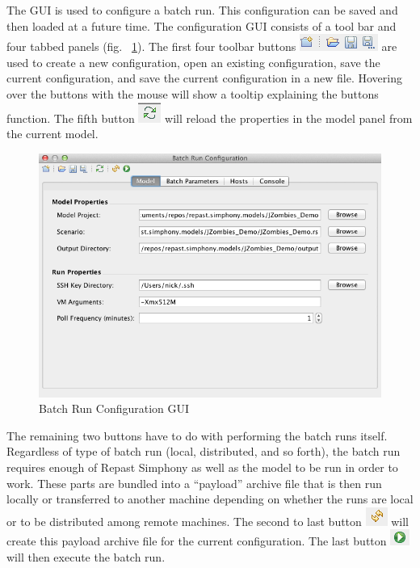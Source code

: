 \documentclass[11pt]{amsart}
\begin{document}
The GUI is used to configure a batch run. This configuration can be saved and then loaded at a future time. The configuration GUI consists of a tool bar and four tabbed panels (fig. ~\ref{fig:config_gui}). The first four toolbar buttons \includegraphics[height=.2in]{images/gui_file_buttons.png} are used to create a new configuration, open an existing configuration, save the current configuration, and save the current configuration in a new file. Hovering over the buttons with the mouse will show a tooltip explaining the buttons function.  The fifth button \includegraphics[height=.2in]{images/reload_button.png} will reload the properties in the model panel from the current model. 

\begin{figure}[h]
\begin{center}
\vspace{.2in}
\centerline {
\includegraphics[width=6in]{images/config_gui.png}
}
\caption{Batch Run Configuration GUI}
\label{fig:config_gui}
\end{center}
\end{figure}


The remaining two buttons have to do with performing the batch runs itself. Regardless of type of batch run (local, distributed, and so forth), the batch run requires enough of Repast Simphony as well as the model to be run in order to work. These parts are bundled into a ``payload'' archive file that is then run locally or transferred to another machine depending on whether the runs are local or to be distributed among remote machines. The second to last button \includegraphics[height=.2in]{images/create_archive_button.png} will create this payload archive file for the current configuration. The last button  \includegraphics[height=.2in]{images/run_button.png} will then execute the batch run.
\end{document}

